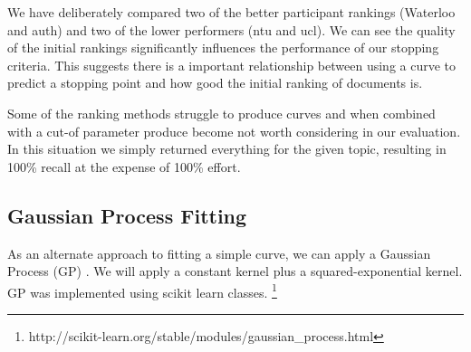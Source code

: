 \begin{table}[H]
\caption{Evaluation of curve fitting for different CLEF 2017 runs. lower = lower-bound confidence interval. Sample size = 3. Results are taken as averages over all topics for search method. with 0.5\% cut-off}

\end{table}

We have deliberately compared two of the better participant rankings (Waterloo and auth) and two of the lower performers (ntu and ucl). We can see the quality of the initial rankings significantly influences the performance of our stopping criteria. This suggests there is a important relationship between using a curve to predict a stopping point and how good the initial ranking of documents is. 

Some of the ranking methods struggle to produce curves and when combined with a cut-of parameter produce become not worth considering in our evaluation. In this situation we simply returned everything for the given topic, resulting in 100\% recall at the expense of 100\% effort.




\subsection{Gaussian Process Fitting}

As an alternate approach to fitting a simple curve, we can apply a Gaussian Process (GP) \cite{ebden2008gaussian}. We will apply a constant kernel plus a squared-exponential kernel. GP was implemented using scikit learn classes. \footnote{http://scikit-learn.org/stable/modules/gaussian\_process.html}


